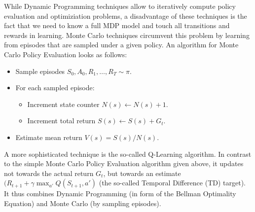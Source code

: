 While Dynamic Programming techniques allow to iteratively compute policy evaluation and optimiziation problems, a disadvantage of these techniques is the fact that we need to know a full MDP model and touch all transitions and rewards in learning. Monte Carlo techniques circumvent this problem by learning from episodes that are sampled under a given policy. An algorithm for Monte Carlo Policy Evaluation looks as follows: 
\begin{itemize}
  \item Sample episodes $S_0, A_0, R_1, \ldots, R_T \sim \pi$.
    \item For each sampled episode:
  \begin{itemize}
  \item Increment state counter $N(s) \leftarrow N(s) + 1$.
  \item Increment total return $S(s) \leftarrow S(s) + G_t$.
    \end{itemize}
  \item Estimate mean return $V(s) = S(s)/N(s)$.
  \end{itemize}

A more sophisticated technique is the so-called Q-Learning algorithm. In contrast to the simple Monte Carlo Policy Evaluation algorithm given above, it updates not towards the actual return $G_t$, but towards an estimate $(R_{t+1} + \gamma \max_{a'} Q(S_{t+1},a')$ (the so-called Temporal Difference (TD) target). It thus combines Dynamic Programming (in form of the Bellman Optimality Equation) and Monte Carlo (by sampling episodes).


